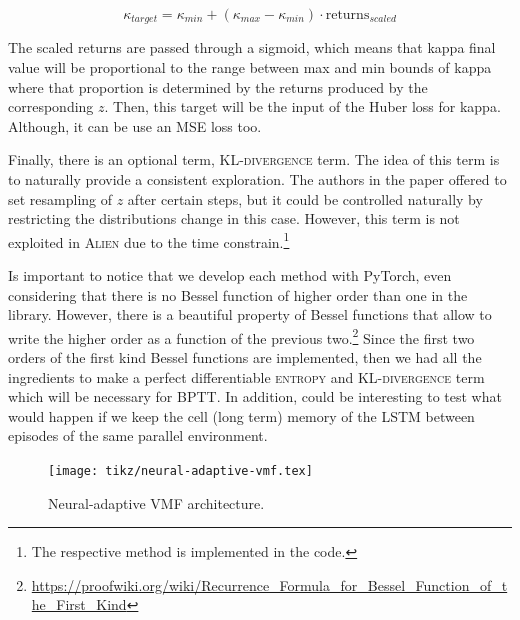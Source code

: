 \begin{equation}
    \kappa_{target} = \kappa_{min} + (\kappa_{max} - \kappa_{min}) \cdot \text{returns}_{scaled}
\end{equation}

The scaled returns are passed through a sigmoid, which means that kappa final value will be proportional to the range between max and min bounds of kappa where that proportion is determined by the returns produced by the corresponding $z$. Then, this target will be the input of the Huber loss for kappa. Although, it can be use an MSE loss too. 

Finally, there is an optional term, \textsc{KL-divergence} term. The idea of this term is to naturally provide a consistent exploration. The authors in the paper offered to set resampling of $z$ after certain steps, but it could be controlled naturally by restricting the distributions change in this case. However, this term is not exploited in \textsc{Alien} due to the time constrain.\footnote{The respective method is implemented in the code.}

Is important to notice that we develop each method with PyTorch, even considering that there is no Bessel function of higher order than one in the library. 
However, there is a beautiful property of Bessel functions that allow to write the higher order as a function of the previous two.\footnote{\url{https://proofwiki.org/wiki/Recurrence_Formula_for_Bessel_Function_of_the_First_Kind}} Since the first two  orders of the first kind Bessel functions are implemented, then we had all the ingredients to make a perfect differentiable \textsc{entropy} and \textsc{KL-divergence} term which will be necessary for BPTT. In addition, could be interesting to test what would happen if we keep the cell (long term) memory of the LSTM between episodes of the same parallel environment.

\begin{figure}[H]
  \centering
  \texttt{[image: tikz/neural-adaptive-vmf.tex]}
  \caption{Neural-adaptive VMF architecture.}
  \label{fig:neural-adaptive-vmf}
\end{figure}

